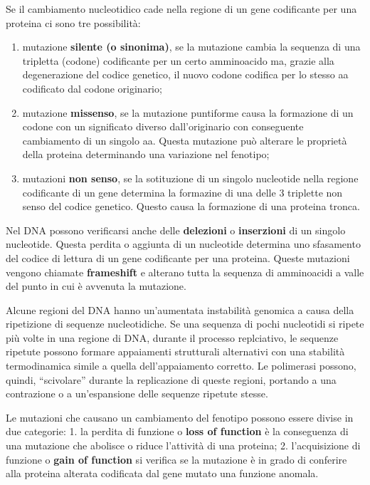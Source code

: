 \documentclass[]{article}
\begin{document}
Se il cambiamento nucleotidico cade nella regione di un gene codificante
per una proteina ci sono tre possibilità:

\begin{enumerate}
\def\labelenumi{\arabic{enumi}.}
\itemsep1pt\parskip0pt
\item
  mutazione \textbf{silente (o sinonima)}, se la mutazione cambia la
  sequenza di una tripletta (codone) codificante per un certo
  amminoacido ma, grazie alla degenerazione del codice genetico, il
  nuovo codone codifica per lo stesso aa codificato dal codone
  originario;
\item
  mutazione \textbf{missenso}, se la mutazione puntiforme causa la
  formazione di un codone con un significato diverso dall'originario con
  conseguente cambiamento di un singolo aa. Questa mutazione può
  alterare le proprietà della proteina determinando una variazione nel
  fenotipo;
\item
  mutazioni \textbf{non senso}, se la sotituzione di un singolo
  nucleotide nella regione codificante di un gene determina la formazine
  di una delle 3 triplette non senso del codice genetico. Questo causa
  la formazione di una proteina tronca.
\end{enumerate}

Nel DNA possono verificarsi anche delle \textbf{delezioni} o
\textbf{inserzioni} di un singolo nucleotide. Questa perdita o aggiunta
di un nucleotide determina uno sfasamento del codice di lettura di un
gene codificante per una proteina. Queste mutazioni vengono chiamate
\textbf{frameshift} e alterano tutta la sequenza di amminoacidi a valle
del punto in cui è avvenuta la mutazione.

Alcune regioni del DNA hanno un'aumentata instabilità genomica a causa
della ripetizione di sequenze nucleotidiche. Se una sequenza di pochi
nucleotidi si ripete più volte in una regione di DNA, durante il
processo replciativo, le sequenze ripetute possono formare appaiamenti
strutturali alternativi con una stabilità termodinamica simile a quella
dell'appaiamento corretto. Le polimerasi possono, quindi, ``scivolare''
durante la replicazione di queste regioni, portando a una contrazione o
a un'espansione delle sequenze ripetute stesse.

Le mutazioni che causano un cambiamento del fenotipo possono essere
divise in due categorie: 1. la perdita di funzione o \textbf{loss of
function} è la conseguenza di una mutazione che abolisce o riduce
l'attività di una proteina; 2. l'acquisizione di funzione o \textbf{gain
of function} si verifica se la mutazione è in grado di conferire alla
proteina alterata codificata dal gene mutato una funzione anomala.
\end{document}
